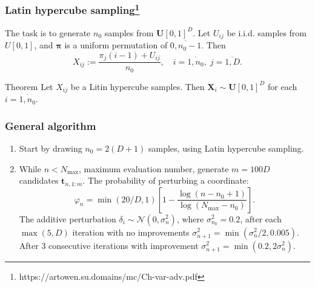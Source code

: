 \documentclass{beamer}
\begin{document}
\begin{frame}
  \frametitle{Latin hypercube sampling\footnote{https://artowen.su.domains/mc/Ch-var-adv.pdf}}
  \begin{minipage}{.3\textwidth}
  \end{minipage}%
  \begin{minipage}{.7\textwidth}
  The task is to generate $n_0$ samples from $\mathbf{U}[0, 1]^D$. Let $U_{ij}$ be i.i.d. samples
  from $U[0, 1]$, and $\boldsymbol{\pi}$ is a uniform permutation of $\overline{0, n_0-1}$.
  Then
  \[
    X_{ij} := \frac{\pi_j(i - 1) + U_{ij}}{n_0}, \quad i = \overline{1, n_0}, \;
    j = \overline{1, D}. 
  \]
  \end{minipage}

  \begin{alertblock}{Theorem}
    Let $X_{ij}$ be a Litin hypercube samples. Then $\mathbf{X}_i \sim \mathbf{U}[0, 1]^D$
    for each $i = \overline{1, n_0}.$
  \end{alertblock}
\end{frame}


\begin{frame}
  \frametitle{General algorithm}
  \begin{enumerate}
    \item Start by drawing $n_0 = 2(D + 1)$ samples, using Latin hypercube sampling.
    \item While $n < N_\text{max}$, maximum evaluation number, generate $m = 100D$ candidates
    $\mathbf{t}_{n, 1:m}$. The probability of perturbing a coordinate:
    \[
      \varphi_n = \min(20/D, 1)\left[1 -\frac{\log(n - n_0 + 1)}{\log(N_\text{max} - n_0)}\right].
    \]
    The additive perturbation $\delta_i \sim \mathcal{N}(0, \sigma_n^2)$, where $\sigma_{n_0}^2 = 0.2$,
    after each $\max(5, D)$ iteration with no improvements
    $\sigma_{n+1}^2 = \min(\sigma_n^2/2, 0.005)$. After 3 consecutive iterations with improvement
    $\sigma_{n+1}^2 = \min(0.2, 2\sigma_n^2)$.
  \end{enumerate}
\end{frame}
\end{document}
